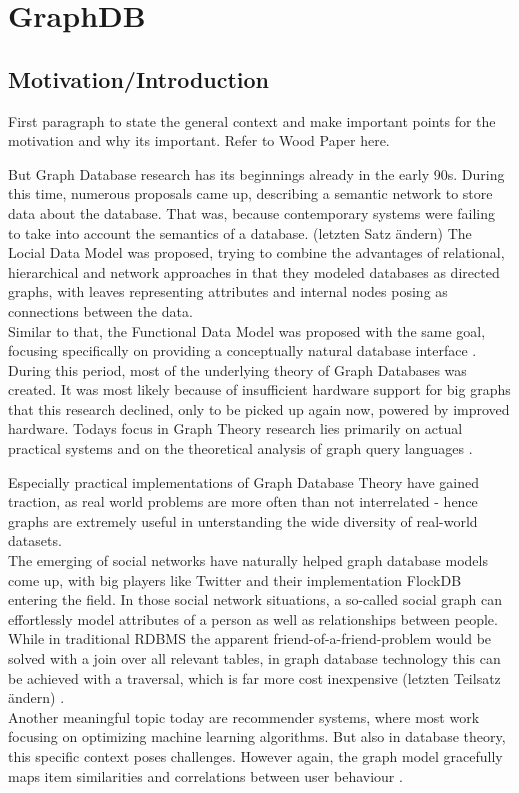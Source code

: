 \chapter{GraphDB}

\section{Motivation/Introduction}
First paragraph to state the general context and make important points for the motivation and why its important. Refer to Wood Paper here.

But Graph Database research has its beginnings already in the early 90s. During this time, numerous proposals came up, describing a semantic network to store data about the database. That was, because contemporary systems were failing to take into account the semantics of a database. (letzten Satz ändern)
The Locial Data Model \cite{KUPERLDM} was proposed, trying to combine the advantages of relational, hierarchical and network approaches in that they modeled databases as directed graphs, with leaves representing attributes and internal nodes posing as connections between the data. \\
Similar to that, the Functional Data Model \cite{Shipman1979} was proposed with the same goal, focusing specifically on providing a conceptually natural database interface \cite{Angles2018AnIT}. \\
During this period, most of the underlying theory of Graph Databases was created.
It was most likely because of insufficient hardware support for big graphs that this research declined, only to be picked up again now, powered by improved hardware. Todays focus in Graph Theory research lies primarily on actual practical systems and on the theoretical analysis of graph query languages \cite{Angles2018AnIT}.

Especially practical implementations of Graph Database Theory have gained traction, as real world problems are more often than not interrelated - hence graphs are extremely useful in unterstanding the wide diversity of real-world datasets.\cite{Robinson2013} \\
The emerging of social networks have naturally helped graph database models come up, with big players like Twitter and their implementation FlockDB entering the field. In those social network situations, a so-called social graph can effortlessly model attributes of a person as well as relationships between people. While in traditional RDBMS the apparent friend-of-a-friend-problem would be solved with a join over all relevant tables, in graph database technology this can be achieved with a traversal, which is far more cost inexpensive (letzten Teilsatz ändern) \cite{Miller2013GraphDA}. \\
Another meaningful topic today are recommender systems, where most work focusing on optimizing machine learning algorithms. But also in database theory, this specific context poses challenges. However again, the graph model gracefully maps item similarities and correlations between user behaviour \cite{Huang2002}.

